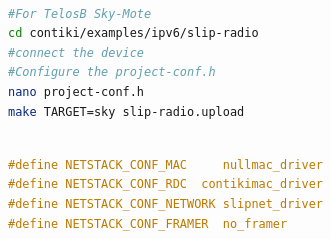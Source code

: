 \begin{lstlisting}[basicstyle=\small,language=bash,caption={Setting for the TelosB mote}]

#For TelosB Sky-Mote
cd contiki/examples/ipv6/slip-radio
#connect the device
#Configure the project-conf.h
nano project-conf.h
make TARGET=sky slip-radio.upload
\end{lstlisting}

\begin{lstlisting}[basicstyle=\small,language=c,caption={Setting for the TelosB mote}]

#define NETSTACK_CONF_MAC     nullmac_driver
#define NETSTACK_CONF_RDC  contikimac_driver
#define NETSTACK_CONF_NETWORK slipnet_driver
#define NETSTACK_CONF_FRAMER  no_framer
\end{lstlisting}
